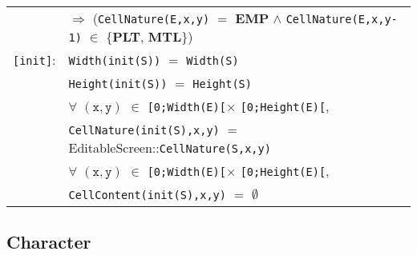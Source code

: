 \documentclass[8pt]{article}
\begin{document}
{\begin{longtable}{rl}
  & \quad\quad $\Rightarrow$ (\texttt{CellNature(E,x,y)} $=$ \textbf{EMP} $\land$ \texttt{CellNature(E,x,y-1)} $\in$ \{\textbf{PLT}, \textbf{MTL}\})\\
  \texttt{[init]}: & \texttt{Width(init(S))} $=$ \texttt{Width(S)} \\
  & \texttt{Height(init(S))} $=$ \texttt{Height(S)} \\
  & $\forall$ $(\mathtt{x},\mathtt{y})$ $\in$ \texttt{[0;Width(E)[}$\times$ \texttt{[0;Height(E)[}, \\
  & \quad\quad \texttt{CellNature(init(S),x,y)} $=$ \textrm{EditableScreen}::\texttt{CellNature(S,x,y)} \\
  & $\forall$ $(\mathtt{x},\mathtt{y})$ $\in$ \texttt{[0;Width(E)[}$\times$ \texttt{[0;Height(E)[}, \\
  & \quad\quad \texttt{CellContent(init(S),x,y)} $=$ $\emptyset$ \\
\end{longtable}}

\subsection{Character}
\end{document}
